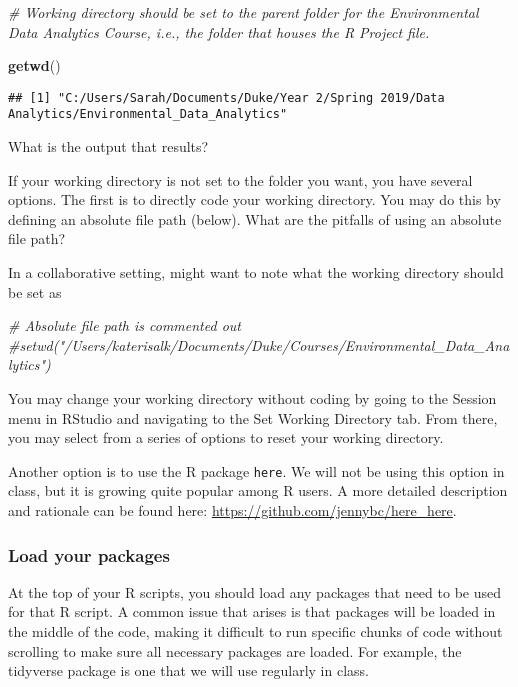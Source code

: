 \documentclass[]{article}
\newenvironment{Shaded}{\begin{snugshade}}{\end{snugshade}}
\newcommand{\KeywordTok}[1]{\textcolor[rgb]{0.13,0.29,0.53}{\textbf{#1}}}
\newcommand{\CommentTok}[1]{\textcolor[rgb]{0.56,0.35,0.01}{\textit{#1}}}
\newcommand{\NormalTok}[1]{#1}
\begin{document}
\begin{Shaded}
\begin{Highlighting}[]
\CommentTok{# Working directory should be set to the parent folder for the Environmental Data Analytics Course, i.e., the folder that houses the R Project file.}

\KeywordTok{getwd}\NormalTok{()}
\end{Highlighting}
\end{Shaded}

\begin{verbatim}
## [1] "C:/Users/Sarah/Documents/Duke/Year 2/Spring 2019/Data Analytics/Environmental_Data_Analytics"
\end{verbatim}

What is the output that results?

If your working directory is not set to the folder you want, you have
several options. The first is to directly code your working directory.
You may do this by defining an absolute file path (below). What are the
pitfalls of using an absolute file path?

In a collaborative setting, might want to note what the working
directory should be set as

\begin{Shaded}
\begin{Highlighting}[]
\CommentTok{# Absolute file path is commented out}
\CommentTok{#setwd("/Users/katerisalk/Documents/Duke/Courses/Environmental_Data_Analytics")}
\end{Highlighting}
\end{Shaded}

You may change your working directory without coding by going to the
Session menu in RStudio and navigating to the Set Working Directory tab.
From there, you may select from a series of options to reset your
working directory.

Another option is to use the R package \texttt{here}. We will not be
using this option in class, but it is growing quite popular among R
users. A more detailed description and rationale can be found here:
\url{https://github.com/jennybc/here_here}.

\subsubsection{Load your packages}\label{load-your-packages}

At the top of your R scripts, you should load any packages that need to
be used for that R script. A common issue that arises is that packages
will be loaded in the middle of the code, making it difficult to run
specific chunks of code without scrolling to make sure all necessary
packages are loaded. For example, the tidyverse package is one that we
will use regularly in class.
\end{document}
